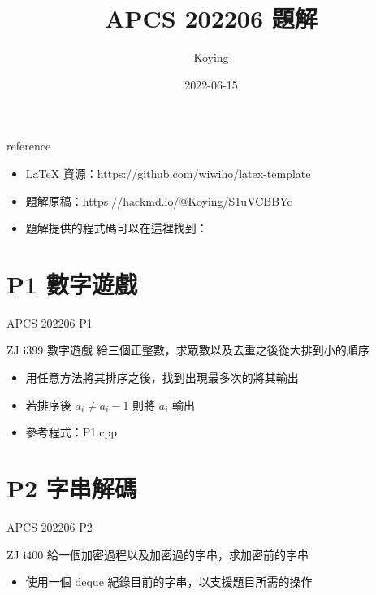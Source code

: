\documentclass[aspectratio=169]{beamer}
\title{APCS 202206 題解}
\author{Koying}
\date{2022-06-15}
\begin{document}
    \begin{frame}
        \titlepage
    \end{frame}
    
    \begin{frame}{reference}
    		\begin{itemize}
    			\item LaTeX 資源：https://github.com/wiwiho/latex-template
    			\item 題解原稿：https://hackmd.io/@Koying/S1uVCBBYc
    			\item 題解提供的程式碼可以在這裡找到：
    		\end{itemize}
    \end{frame}
    
	\section{P1 數字遊戲}    
    
    \begin{frame}{APCS 202206 P1}
    		\begin{block}{ZJ i399 數字遊戲}
    			給三個正整數，求眾數以及去重之後從大排到小的順序
    		\end{block}
		
		\begin{itemize}
			\item 用任意方法將其排序之後，找到出現最多次的將其輸出
			\item 若排序後 $a_i \neq a_i-1$ 則將 $a_i$ 輸出
			\item 參考程式：P1.cpp
		\end{itemize}		    		
    		
    \end{frame}
    
	\section{P2 字串解碼}    
    
    \begin{frame}{APCS 202206 P2}
    		\begin{block}{ZJ i400}
    			給一個加密過程以及加密過的字串，求加密前的字串
    		\end{block}
    		
    		\begin{itemize}
    			\item 使用一個 deque 紀錄目前的字串，以支援題目所需的操作
    		\end{itemize}
    \end{frame}
    
\end{document}
